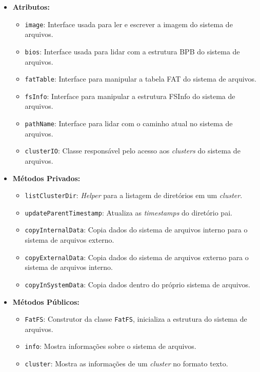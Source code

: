 \documentclass[
    12pt,				%
    oneside,   	        %
    a4paper,			%
    english,			%
    french,				%
    spanish,			%
    brazil,				%
    ]{pacotes/abntex2}
\begin{document}
\begin{itemize}
    \item \textbf{Atributos:}
        \begin{itemize}
            \item \texttt{image}: Interface usada para ler e escrever a imagem do sistema de arquivos.
            \item \texttt{bios}: Interface usada para lidar com a estrutura BPB do sistema de arquivos.
            \item \texttt{fatTable}: Interface para manipular a tabela FAT do sistema de arquivos.
            \item \texttt{fsInfo}: Interface para manipular a estrutura FSInfo do sistema de arquivos.
            \item \texttt{pathName}: Interface para lidar com o caminho atual no sistema de arquivos.
            \item \texttt{clusterIO}: Classe responsável pelo acesso aos \textit{clusters} do sistema de arquivos.
        \end{itemize}
    \item \textbf{Métodos Privados:}
        \begin{itemize}
            \item \texttt{listClusterDir}: \textit{Helper} para a listagem de diretórios em um \textit{cluster}.
            \item \texttt{updateParentTimestamp}: Atualiza as \textit{timestamps} do diretório pai.
            \item \texttt{copyInternalData}: Copia dados do sistema de arquivos interno para o sistema de arquivos externo.
            \item \texttt{copyExternalData}: Copia dados do sistema de arquivos externo para o sistema de arquivos interno.
            \item \texttt{copyInSystemData}: Copia dados dentro do próprio sistema de arquivos.
        \end{itemize}
    \item \textbf{Métodos Públicos:}
        \begin{itemize}
            \item \texttt{FatFS}: Construtor da classe \texttt{FatFS}, inicializa a estrutura do sistema de arquivos.
            \item \texttt{info}: Mostra informações sobre o sistema de arquivos.
            \item \texttt{cluster}: Mostra as informações de um \textit{cluster} no formato texto.

\end{itemize}
\end{itemize}
\end{document}
